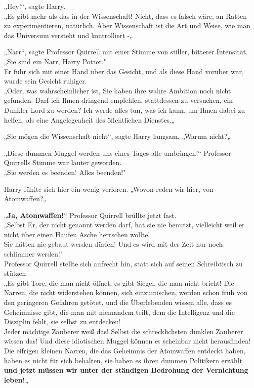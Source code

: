 {„Hey!“, sagte Harry.\\ „Es gibt mehr als das in der Wissenschaft! Nicht, dass es falsch wäre, an Ratten zu experimentieren, natürlich. Aber Wissenschaft ist die Art und Weise, wie man das Universum versteht und kontrolliert -„

„Narr“, sagte Professor Quirrell mit einer Stimme von stiller, bitterer Intensität.\\ „Sie sind ein Narr, Harry Potter."\\ Er fuhr sich mit einer Hand über das Gesicht, und als diese Hand vorüber war, wurde sein Gesicht ruhiger.\\ „Oder, was wahrscheinlicher ist, Sie haben ihre wahre Ambition noch nicht gefunden. Darf ich Ihnen dringend empfehlen, stattdessen zu versuchen, ein Dunkler Lord zu werden? Ich werde alles tun, was ich kann, um Ihnen dabei zu helfen, als eine Angelegenheit des öffentlichen Dienstes.„

„Sie mögen die Wissenschaft nicht“, sagte Harry langsam. „Warum nicht?„

„Diese dummen Muggel werden uns eines Tages alle umbringen!“ Professor Quirrells Stimme war lauter geworden.\\ „Sie werden es beenden! Alles beenden!"

Harry fühlte sich hier ein wenig verloren. „Wovon reden wir hier, von Atomwaffen?„

„\textbf{Ja, Atomwaffen!}“ Professor Quirrell brüllte jetzt fast.\\ „Selbst Er, der nicht genannt werden darf, hat sie nie benutzt, vielleicht weil er nicht über einen Haufen Asche herrschen wollte!\\ Sie hätten nie gebaut werden dürfen! Und es wird mit der Zeit nur noch schlimmer werden!"\\ Professor Quirrell stellte sich aufrecht hin, statt sich auf seinen Schreibtisch zu stützen.\\ „Es gibt Tore, die man nicht öffnet, es gibt Siegel, die man nicht bricht! Die Narren, die nicht widerstehen können, sich einzumischen, werden schon früh von den geringeren Gefahren getötet, und die Überlebenden wissen alle, dass es Geheimnisse gibt, die man mit niemandem teilt, dem die Intelligenz und die Disziplin fehlt, sie selbst zu entdecken!\\ Jeder mächtige Zauberer weiß das! Selbst die schrecklichsten dunklen Zauberer wissen das! Und diese idiotischen Muggel können es scheinbar nicht herausfinden!\\ Die eifrigen kleinen Narren, die das Geheimnis der Atomwaffen entdeckt haben, haben es nicht für sich behalten, sie haben es ihren dummen Politikern erzählt \textbf{und jetzt müssen wir unter der ständigen Bedrohung der Vernichtung leben!}„

}
